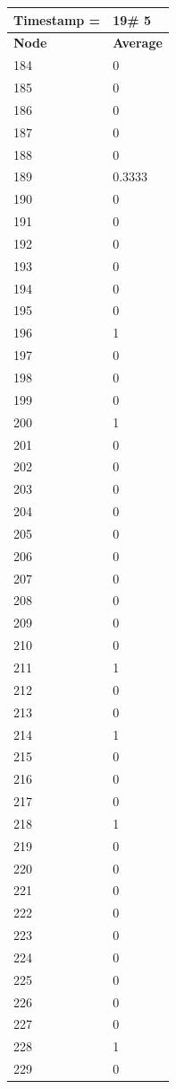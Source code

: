 \begin{tabular}{|l||l|}
\hline
\textbf{Timestamp =} & \textbf{19}\# 5\\\hline
	\textbf{Node} & \textbf{Average} \\ \hline
\hline
	184 & 0 \\ \hline
	185 & 0 \\ \hline
	186 & 0 \\ \hline
	187 & 0 \\ \hline
	188 & 0 \\ \hline
	189 & 0.3333 \\ \hline
	190 & 0 \\ \hline
	191 & 0 \\ \hline
	192 & 0 \\ \hline
	193 & 0 \\ \hline
	194 & 0 \\ \hline
	195 & 0 \\ \hline
	196 & 1 \\ \hline
	197 & 0 \\ \hline
	198 & 0 \\ \hline
	199 & 0 \\ \hline
	200 & 1 \\ \hline
	201 & 0 \\ \hline
	202 & 0 \\ \hline
	203 & 0 \\ \hline
	204 & 0 \\ \hline
	205 & 0 \\ \hline
	206 & 0 \\ \hline
	207 & 0 \\ \hline
	208 & 0 \\ \hline
	209 & 0 \\ \hline
	210 & 0 \\ \hline
	211 & 1 \\ \hline
	212 & 0 \\ \hline
	213 & 0 \\ \hline
	214 & 1 \\ \hline
	215 & 0 \\ \hline
	216 & 0 \\ \hline
	217 & 0 \\ \hline
	218 & 1 \\ \hline
	219 & 0 \\ \hline
	220 & 0 \\ \hline
	221 & 0 \\ \hline
	222 & 0 \\ \hline
	223 & 0 \\ \hline
	224 & 0 \\ \hline
	225 & 0 \\ \hline
	226 & 0 \\ \hline
	227 & 0 \\ \hline
	228 & 1 \\ \hline
	229 & 0 \\ \hline
\end{tabular}
